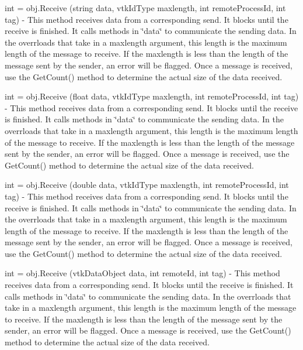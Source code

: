 \begin{DoxyItemize}
\item {\ttfamily int = obj.\-Receive (string data, vtk\-Id\-Type maxlength, int remote\-Process\-Id, int tag)} -\/ This method receives data from a corresponding send. It blocks until the receive is finished. It calls methods in \char`\"{}data\char`\"{} to communicate the sending data. In the overrloads that take in a {\ttfamily maxlength} argument, this length is the maximum length of the message to receive. If the maxlength is less than the length of the message sent by the sender, an error will be flagged. Once a message is received, use the Get\-Count() method to determine the actual size of the data received.  
\item {\ttfamily int = obj.\-Receive (float data, vtk\-Id\-Type maxlength, int remote\-Process\-Id, int tag)} -\/ This method receives data from a corresponding send. It blocks until the receive is finished. It calls methods in \char`\"{}data\char`\"{} to communicate the sending data. In the overrloads that take in a {\ttfamily maxlength} argument, this length is the maximum length of the message to receive. If the maxlength is less than the length of the message sent by the sender, an error will be flagged. Once a message is received, use the Get\-Count() method to determine the actual size of the data received.  
\item {\ttfamily int = obj.\-Receive (double data, vtk\-Id\-Type maxlength, int remote\-Process\-Id, int tag)} -\/ This method receives data from a corresponding send. It blocks until the receive is finished. It calls methods in \char`\"{}data\char`\"{} to communicate the sending data. In the overrloads that take in a {\ttfamily maxlength} argument, this length is the maximum length of the message to receive. If the maxlength is less than the length of the message sent by the sender, an error will be flagged. Once a message is received, use the Get\-Count() method to determine the actual size of the data received.  
\item {\ttfamily int = obj.\-Receive (vtk\-Data\-Object data, int remote\-Id, int tag)} -\/ This method receives data from a corresponding send. It blocks until the receive is finished. It calls methods in \char`\"{}data\char`\"{} to communicate the sending data. In the overrloads that take in a {\ttfamily maxlength} argument, this length is the maximum length of the message to receive. If the maxlength is less than the length of the message sent by the sender, an error will be flagged. Once a message is received, use the Get\-Count() method to determine the actual size of the data received.  

\end{DoxyItemize}
